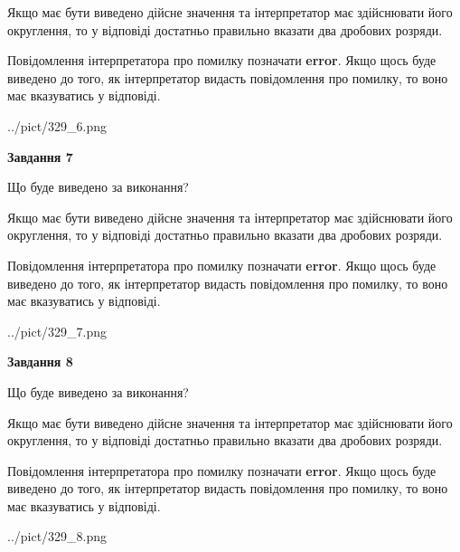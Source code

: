 \documentclass[12pt, ukrainian]{article}
\begin{document}
{\begin {Large}
Якщо має бути виведено дійсне значення та інтерпретатор має здійснювати його округлення, 
то у відповіді достатньо правильно вказати два дробових розряди.

Повідомлення інтерпретатора про помилку позначати \textbf{error}.
Якщо щось буде виведено до того, як інтерпретатор видасть повідомлення про помилку, 
то воно має вказуватись у відповіді. \par

\begin{center}
	{../pict/329_6.png}
\end{center}
\newpage

{\begin {center}\textbf{Завдання 7}\end {center}}\par
Що буде виведено за виконання? \par

Якщо має бути виведено дійсне значення та інтерпретатор має здійснювати його округлення, 
то у відповіді достатньо правильно вказати два дробових розряди.

Повідомлення інтерпретатора про помилку позначати \textbf{error}.
Якщо щось буде виведено до того, як інтерпретатор видасть повідомлення про помилку, 
то воно має вказуватись у відповіді. \par

\begin{center}
	{../pict/329_7.png}
\end{center}
\newpage

{\begin {center}\textbf{Завдання 8}\end {center}}\par
Що буде виведено за виконання? \par

Якщо має бути виведено дійсне значення та інтерпретатор має здійснювати його округлення, 
то у відповіді достатньо правильно вказати два дробових розряди.

Повідомлення інтерпретатора про помилку позначати \textbf{error}.
Якщо щось буде виведено до того, як інтерпретатор видасть повідомлення про помилку, 
то воно має вказуватись у відповіді. \par

\begin{center}
	{../pict/329_8.png}
\end{center}
\newpage


\end{Large}}
\end{document}
